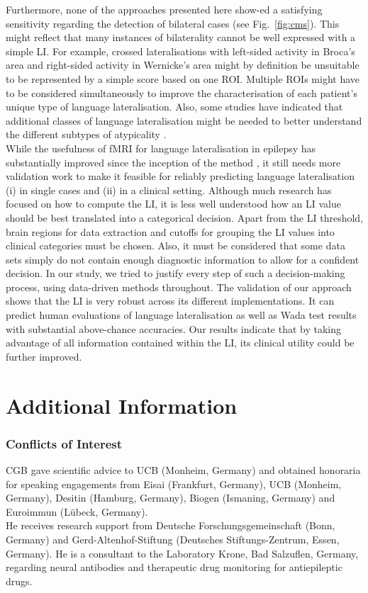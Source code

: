 \documentclass[fleqn,10pt]{SelfArx} %
\begin{document}
Furthermore, none of the approaches presented here show-ed a satisfying sensitivity regarding the detection of bilateral cases (see Fig.~\ref{fig:cms}). This might reflect that many instances of bilaterality cannot be well expressed with a simple LI. For example, crossed lateralisations with left-sided activity in Broca’s area and right-sided activity in Wernicke’s area \citep{Kurthen_1992} might by definition be unsuitable to be represented by a simple score based on one ROI. Multiple ROIs might have to be considered simultaneously \citep{Benjamin_2017} to improve the characterisation of each patient’s unique type of language lateralisation. Also, some studies have indicated that additional classes of language lateralisation might be needed to better understand the different subtypes of atypicality \citep{Berl_2014}.\\
While the usefulness of fMRI for language lateralisation in epilepsy has substantially improved since the inception of the method \citep{Szaflarski_2017}, it still needs more validation work to make it feasible for reliably predicting language lateralisation (i) in single cases and (ii) in a clinical setting. Although much research has focused on how to compute the LI, it is less well understood how an LI value should be best translated into a categorical decision. Apart from the LI threshold, brain regions for data extraction and cutoffs for grouping the LI values into clinical categories must be chosen. Also, it must be considered that some data sets simply do not contain enough diagnostic information to allow for a confident decision. In our study, we tried to justify every step of such a decision-making process, using data-driven methods throughout. The validation of our approach shows that the LI is very robust across its different implementations. It can predict human evaluations of language lateralisation as well as Wada test results with substantial above-chance accuracies. Our results indicate that by taking advantage of all information contained within the LI, its clinical utility could be further improved.\\



\section*{Additional Information}

\subsubsection*{Conflicts of Interest}
\small{CGB gave scientific advice to UCB (Monheim, Germany) and obtained honoraria for speaking engagements from Eisai (Frankfurt, Germany), UCB (Monheim, Germany), Desitin (Hamburg, Germany), Biogen (Ismaning, Germany) and Euroimmun (Lübeck, Germany).\\
He receives research support from Deutsche Forschungsgemeinschaft (Bonn, Germany) and Gerd-Altenhof-Stiftung (Deutsches Stiftungs-Zentrum, Essen, Germany). He is a consultant to the Laboratory Krone, Bad Salzuflen, Germany, regarding neural antibodies and therapeutic drug monitoring for antiepileptic drugs.}
\end{document}
